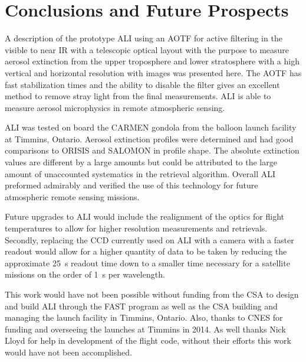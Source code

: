 \documentclass[12pt]{article}
\begin{document}
\section{Conclusions and Future Prospects}

A description of the prototype ALI using an AOTF for active filtering in the visible to near IR with a telescopic optical layout with the purpose to measure aerosol extinction from the upper troposphere and lower stratosphere with a high vertical and horizontal resolution with images was presented here. The AOTF has fast stabilization times and the ability to disable the filter gives an excellent method to remove stray light from the final measurements. ALI is able to measure aerosol microphysics in remote atmospheric sensing.

ALI was tested on board the CARMEN gondola from the balloon launch facility at Timmins, Ontario. Aerosol extinction profiles were determined and had good comparisons to ORISIS and SALOMON in profile shape. The absolute extinction values are different by a large amounts but could be attributed to the large amount of unaccounted systematics in the retrieval algorithm. Overall ALI preformed admirably and verified the use of this technology for future atmospheric remote sensing missions.

Future upgrades to ALI would include the realignment of the optics for flight temperatures to allow for higher resolution measurements and retrievals. Secondly, replacing the CCD currently used on ALI with a camera with a faster readout would allow for a higher quantity of data to be taken by reducing the approximate 25~s readout time down to a smaller time necessary for a satellite missions on the order of 1~s per wavelength.

This work would have not been possible without funding from the CSA to design and build ALI through the FAST program as well as the CSA building and managing the launch facility in Timmins, Ontario. Also, thanks to CNES for funding and overseeing the launches at Timmins in 2014. As well thanks Nick Lloyd for help in development of the flight code, without their efforts this work would have not been accomplished.




\newpage
\end{document}
